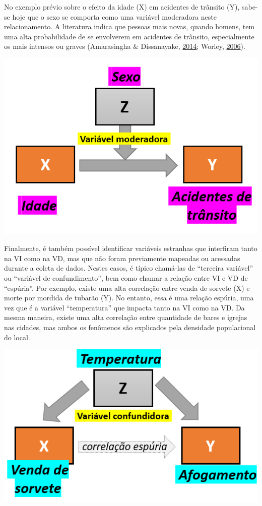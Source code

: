 \documentclass[
]{book}
\begin{document}
No exemplo prévio sobre o efeito da idade (X) em acidentes de trânsito
(Y), sabe-se hoje que o sexo se comporta como uma variável moderadora
neste relacionamento. A literatura indica que pessoas mais novas, quando
homens, tem uma alta probabilidade de se envolverem em acidentes de
trânsito, especialmente os mais intensos ou graves (Amarasingha \&
Dissanayake, \protect\hyperlink{ref-Amarasingha2014}{2014}; Worley,
\protect\hyperlink{ref-PRB2006}{2006}).

\includegraphics{./img/cap_moderacao.png}

Finalmente, é também possível identificar variáveis estranhas que
interfiram tanto na VI como na VD, mas que não foram previamente
mapeadas ou acessadas durante a coleta de dados. Nestes casos, é típico
chamá-las de ``terceira variável'' ou ``variável de confundimento'', bem
como chamar a relação entre VI e VD de ``espúria''. Por exemplo, existe
uma alta correlação entre venda de sorvete (X) e morte por mordida de
tubarão (Y). No entanto, essa é uma relação espúria, uma vez que é a
variável ``temperatura'' que impacta tanto na VI como na VD. Da mesma
maneira, existe uma alta correlação entre quantidade de bares e igrejas
nas cidades, mas ambos os fenômenos são explicados pela densidade
populacional do local.

\includegraphics{./img/cap_confundimento.png}
\end{document}
